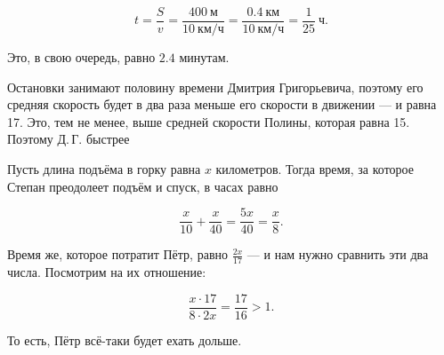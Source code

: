\begin{itemize}

\itA $$t = \frac{S}{v} = \frac{\SI{400}{\text{м}}}{\SI{10}{\text{км/ч}}}
	= \frac{\SI{0.4}{\text{км}}}{\SI{10}{\text{км/ч}}}
	= \frac{1}{25}\ \text{ч}.$$

Это, в свою очередь, равно $2.4$ минутам.

\itB Остановки занимают половину времени Дмитрия Григорьевича, поэтому его средняя скорость будет в два раза меньше его скорости в движении — и равна \SI{17}{}. Это, тем не менее, выше средней скорости Полины, которая равна \SI{15}{}. Поэтому Д.\,Г. быстрее

\itC Пусть длина подъёма в горку равна $x$ километров. Тогда время, за которое Степан преодолеет подъём и спуск, в часах равно

$$\frac{x}{10} + \frac{x}{40} = \frac{5x}{40} = \frac{x}{8}.$$

Время же, которое потратит Пётр, равно $\frac{2x}{17}$ — и нам нужно сравнить эти два числа. Посмотрим на их отношение:

$$\frac{x \cdot 17}{8 \cdot 2x} = \frac{17}{16} > 1.$$

То есть, Пётр всё-таки будет ехать дольше.

\end{itemize}